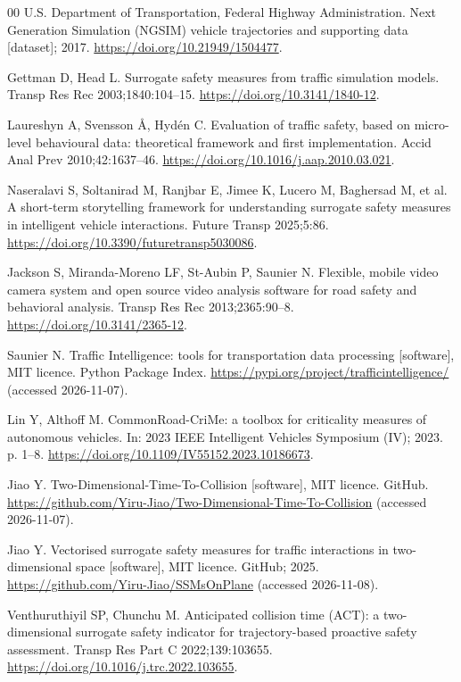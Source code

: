 \documentclass[preprint,12pt, a4paper]{elsarticle}
\begin{document}
\begin{thebibliography}{00}
 U.S. Department of Transportation, Federal Highway Administration. Next Generation Simulation (NGSIM) vehicle trajectories and supporting data [dataset]; 2017. \url{https://doi.org/10.21949/1504477}.

 Gettman D, Head L. Surrogate safety measures from traffic simulation models. Transp Res Rec 2003;1840:104--15. \url{https://doi.org/10.3141/1840-12}.

 Laureshyn A, Svensson Å, Hydén C. Evaluation of traffic safety, based on micro-level behavioural data: theoretical framework and first implementation. Accid Anal Prev 2010;42:1637--46. \url{https://doi.org/10.1016/j.aap.2010.03.021}.

 Naseralavi S, Soltanirad M, Ranjbar E, Jimee K, Lucero M, Baghersad M, et al. A short-term storytelling framework for understanding surrogate safety measures in intelligent vehicle interactions. Future Transp 2025;5:86. \url{https://doi.org/10.3390/futuretransp5030086}.

 Jackson S, Miranda-Moreno LF, St-Aubin P, Saunier N. Flexible, mobile video camera system and open source video analysis software for road safety and behavioral analysis. Transp Res Rec 2013;2365:90--8. \url{https://doi.org/10.3141/2365-12}.

 Saunier N. Traffic Intelligence: tools for transportation data processing [software], MIT licence. Python Package Index. \url{https://pypi.org/project/trafficintelligence/} (accessed 2026-11-07).

 Lin Y, Althoff M. CommonRoad-CriMe: a toolbox for criticality measures of autonomous vehicles. In: 2023 IEEE Intelligent Vehicles Symposium (IV); 2023. p. 1--8. \url{https://doi.org/10.1109/IV55152.2023.10186673}.

 Jiao Y. Two-Dimensional-Time-To-Collision [software], MIT licence. GitHub. \url{https://github.com/Yiru-Jiao/Two-Dimensional-Time-To-Collision} (accessed 2026-11-07).

 Jiao Y. Vectorised surrogate safety measures for traffic interactions in two-dimensional space [software], MIT licence. GitHub; 2025. \url{https://github.com/Yiru-Jiao/SSMsOnPlane} (accessed 2026-11-08).

 Venthuruthiyil SP, Chunchu M. Anticipated collision time (ACT): a two-dimensional surrogate safety indicator for trajectory-based proactive safety assessment. Transp Res Part C 2022;139:103655. \url{https://doi.org/10.1016/j.trc.2022.103655}.


\end{thebibliography}
\end{document}
